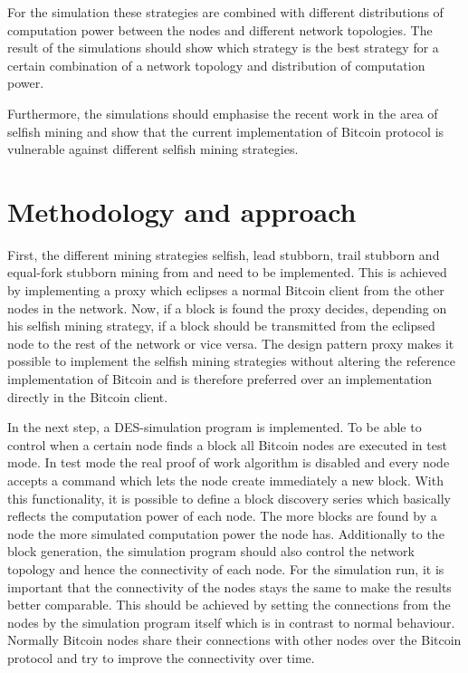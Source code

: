 \documentclass{scrartcl}
\begin{document}
For the simulation these strategies are combined with different distributions of computation power between the nodes and different network topologies. The result of the simulations should show which strategy is the best strategy for a certain combination of a network topology and distribution of computation power. 

Furthermore, the simulations should emphasise the recent work in the area of selfish mining and show that the current implementation of Bitcoin protocol is vulnerable against different selfish mining strategies.

\section{Methodology and approach}
First, the different mining strategies selfish, lead stubborn, trail stubborn and equal-fork stubborn mining from \citeauthor{nayak2016stubborn} and \citeauthor{eyal2014majority} need to be implemented. This is achieved by implementing a proxy which eclipses a normal Bitcoin client from the other nodes in the network. Now, if a block is found the proxy decides, depending on his selfish mining strategy, if a block should be transmitted from the eclipsed node to the rest of the network or vice versa. The design pattern proxy makes it possible to implement the selfish mining strategies without altering the reference implementation of Bitcoin and is therefore preferred over an implementation directly in the Bitcoin client.

In the next step, a DES-simulation program is implemented. To be able to control when a certain node finds a block all Bitcoin nodes are executed in test mode. In test mode the real proof of work algorithm is disabled and every node accepts a command which lets the node create immediately a new block. With this functionality, it is possible to define a block discovery series which basically reflects the computation power of each node. The more blocks are found by a node the more simulated computation power the node has. Additionally to the block generation, the simulation program should also control the network topology and hence the connectivity of each node. For the simulation run, it is important that the connectivity of the nodes stays the same to make the results better comparable. This should be achieved by setting the connections from the nodes by the simulation program itself which is in contrast to normal behaviour. Normally Bitcoin nodes share their connections with other nodes over the Bitcoin protocol and try to improve the connectivity over time.
\end{document}
